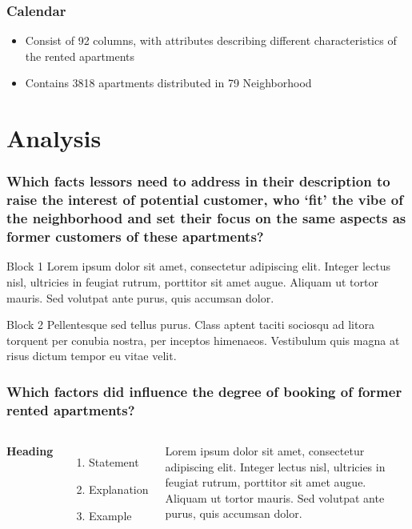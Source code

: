 \documentclass{beamer}
\begin{document}

\begin{frame}
\frametitle{Calendar}
\begin{itemize}
\item Consist of 92 columns, with attributes describing different characteristics of the rented apartments
\item Contains 3818 apartments distributed in 79 Neighborhood
\end{itemize}
\end{frame}

\section{Analysis}

\begin{frame}
\frametitle{Which facts lessors need to address in their description to raise the interest of potential customer, who ‘fit’ the vibe of the neighborhood and set their focus on the same aspects as former customers of these apartments?}
\begin{block}{Block 1}
Lorem ipsum dolor sit amet, consectetur adipiscing elit. Integer lectus nisl, ultricies in feugiat rutrum, porttitor sit amet augue. Aliquam ut tortor mauris. Sed volutpat ante purus, quis accumsan dolor.
\end{block}

\begin{block}{Block 2}
Pellentesque sed tellus purus. Class aptent taciti sociosqu ad litora torquent per conubia nostra, per inceptos himenaeos. Vestibulum quis magna at risus dictum tempor eu vitae velit.
\end{block}
\end{frame}


\begin{frame}
\frametitle{Which factors did influence the degree of booking of former rented apartments?}
\begin{columns}[c] %

\textbf{Heading}
\begin{enumerate}
\item Statement
\item Explanation
\item Example
\end{enumerate}

Lorem ipsum dolor sit amet, consectetur adipiscing elit. Integer lectus nisl, ultricies in feugiat rutrum, porttitor sit amet augue. Aliquam ut tortor mauris. Sed volutpat ante purus, quis accumsan dolor.

\end{columns}
\end{frame}
\end{document}
